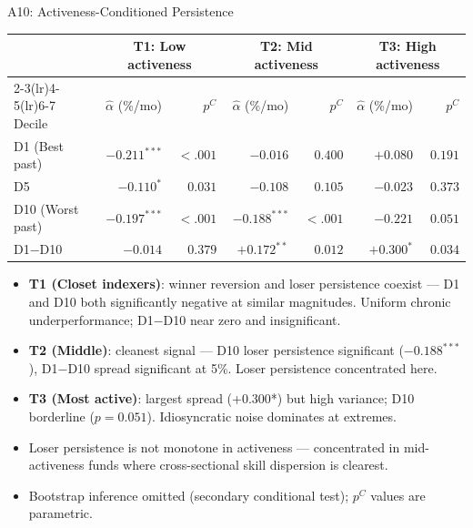 \documentclass[10pt, aspectratio=169]{beamer}
\begin{document}
\begin{frame}{A10: Activeness-Conditioned Persistence}
  \scriptsize
  \setlength{\tabcolsep}{4pt}
  \begin{tabular}{@{}lrrrrrr@{}}
    \toprule
    & \multicolumn{2}{c}{T1: Low activeness} & \multicolumn{2}{c}{T2: Mid activeness} & \multicolumn{2}{c}{T3: High activeness} \\
    \cmidrule(lr){2-3}\cmidrule(lr){4-5}\cmidrule(lr){6-7}
    Decile & $\hat{\alpha}$ (\%/mo) & $p^C$ & $\hat{\alpha}$ (\%/mo) & $p^C$ & $\hat{\alpha}$ (\%/mo) & $p^C$ \\
    \midrule
    D1 (Best past)   & $-0.211^{***}$ & $<.001$ & $-0.016$ & $0.400$ & $+0.080$ & $0.191$ \\
    D5               & $-0.110^{*}$   & $0.031$ & $-0.108$ & $0.105$ & $-0.023$ & $0.373$ \\
    D10 (Worst past) & $-0.197^{***}$ & $<.001$ & $-0.188^{***}$ & $<.001$ & $-0.221$ & $0.051$ \\
    \midrule
    D1$-$D10         & $-0.014$ & $0.379$ & $+0.172^{**}$ & $0.012$ & $+0.300^{*}$ & $0.034$ \\
    \bottomrule
  \end{tabular}
  \vspace{5pt}
  \begin{itemize}\itemsep3pt
    \item \textbf{T1 (Closet indexers)}: winner reversion and loser persistence coexist —
          D1 and D10 both significantly negative at similar magnitudes. Uniform chronic
          underperformance; D1$-$D10 near zero and insignificant.
    \item \textbf{T2 (Middle)}: cleanest signal — D10 loser persistence significant
          ($-0.188^{***}$), D1$-$D10 spread significant at 5\%. Loser persistence
          concentrated here.
    \item \textbf{T3 (Most active)}: largest spread (+0.300*) but high variance;
          D10 borderline ($p=0.051$). Idiosyncratic noise dominates at extremes.
    \item Loser persistence is not monotone in activeness — concentrated in mid-activeness
          funds where cross-sectional skill dispersion is clearest.
    \item \footnotesize Bootstrap inference omitted (secondary conditional test); $p^C$ values are parametric.
  \end{itemize}
\end{frame}

\end{document}
